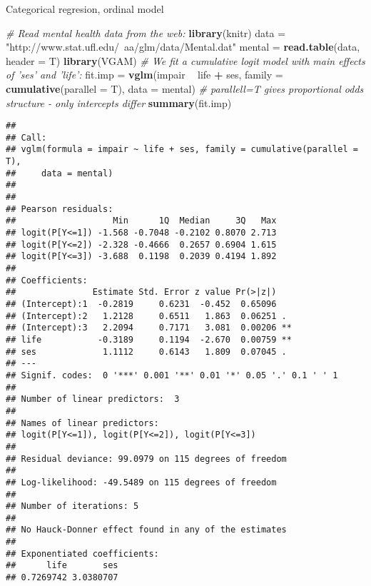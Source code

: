 \documentclass[ignorenonframetext,]{beamer}
\newenvironment{Shaded}{\begin{snugshade}}{\end{snugshade}}
\newcommand{\KeywordTok}[1]{\textcolor[rgb]{0.13,0.29,0.53}{\textbf{#1}}}
\newcommand{\DataTypeTok}[1]{\textcolor[rgb]{0.13,0.29,0.53}{#1}}
\newcommand{\StringTok}[1]{\textcolor[rgb]{0.31,0.60,0.02}{#1}}
\newcommand{\CommentTok}[1]{\textcolor[rgb]{0.56,0.35,0.01}{\textit{#1}}}
\newcommand{\OperatorTok}[1]{\textcolor[rgb]{0.81,0.36,0.00}{\textbf{#1}}}
\newcommand{\NormalTok}[1]{#1}
\begin{document}
\begin{frame}[fragile]

\begin{block}{Categorical regresion, ordinal model}

\begin{Shaded}
\begin{Highlighting}[]
\CommentTok{# Read mental health data from the web:}
\KeywordTok{library}\NormalTok{(knitr)}
\NormalTok{data =}\StringTok{ "http://www.stat.ufl.edu/~aa/glm/data/Mental.dat"}
\NormalTok{mental =}\StringTok{ }\KeywordTok{read.table}\NormalTok{(data, }\DataTypeTok{header =}\NormalTok{ T)}
\KeywordTok{library}\NormalTok{(VGAM)}
\CommentTok{# We fit a cumulative logit model with main effects of 'ses' and 'life':}
\NormalTok{fit.imp =}\StringTok{ }\KeywordTok{vglm}\NormalTok{(impair }\OperatorTok{~}\StringTok{ }\NormalTok{life }\OperatorTok{+}\StringTok{ }\NormalTok{ses, }\DataTypeTok{family =} \KeywordTok{cumulative}\NormalTok{(}\DataTypeTok{parallel =}\NormalTok{ T), }\DataTypeTok{data =}\NormalTok{ mental)}
\CommentTok{# parallell=T gives proportional odds structure - only intercepts differ}
\KeywordTok{summary}\NormalTok{(fit.imp)}
\end{Highlighting}
\end{Shaded}

\begin{verbatim}
## 
## Call:
## vglm(formula = impair ~ life + ses, family = cumulative(parallel = T), 
##     data = mental)
## 
## 
## Pearson residuals:
##                   Min      1Q  Median     3Q   Max
## logit(P[Y<=1]) -1.568 -0.7048 -0.2102 0.8070 2.713
## logit(P[Y<=2]) -2.328 -0.4666  0.2657 0.6904 1.615
## logit(P[Y<=3]) -3.688  0.1198  0.2039 0.4194 1.892
## 
## Coefficients: 
##               Estimate Std. Error z value Pr(>|z|)   
## (Intercept):1  -0.2819     0.6231  -0.452  0.65096   
## (Intercept):2   1.2128     0.6511   1.863  0.06251 . 
## (Intercept):3   2.2094     0.7171   3.081  0.00206 **
## life           -0.3189     0.1194  -2.670  0.00759 **
## ses             1.1112     0.6143   1.809  0.07045 . 
## ---
## Signif. codes:  0 '***' 0.001 '**' 0.01 '*' 0.05 '.' 0.1 ' ' 1
## 
## Number of linear predictors:  3 
## 
## Names of linear predictors: 
## logit(P[Y<=1]), logit(P[Y<=2]), logit(P[Y<=3])
## 
## Residual deviance: 99.0979 on 115 degrees of freedom
## 
## Log-likelihood: -49.5489 on 115 degrees of freedom
## 
## Number of iterations: 5 
## 
## No Hauck-Donner effect found in any of the estimates
## 
## Exponentiated coefficients:
##      life       ses 
## 0.7269742 3.0380707
\end{verbatim}

\end{block}

\end{frame}
\end{document}
